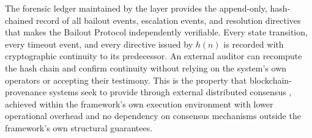 The forensic ledger maintained by the \fact{} layer provides the append-only, hash-chained record of all bailout events, escalation events, and resolution directives that makes the Bailout Protocol independently verifiable. Every state transition, every timeout event, and every directive issued by $h(n)$ is recorded with cryptographic continuity to its predecessor. An external auditor can recompute the hash chain and confirm continuity without relying on the system's own operators or accepting their testimony. This is the property that blockchain-provenance systems seek to provide through external distributed consensus \cite{blockchain_ai_governance} \cite{on_chain_provenance_ai}, achieved within the framework's own execution environment with lower operational overhead and no dependency on consensus mechanisms outside the framework's own structural guarantees.
